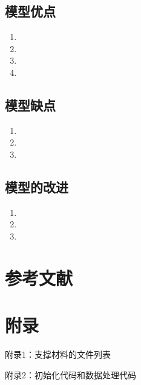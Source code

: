 \documentclass[a4paper]{article}
\begin{document}
	\subsection{模型优点}
	\begin{enumerate}
		\item 
		\item 
		\item 
		\item 
	\end{enumerate}
	
	\subsection{模型缺点}
	\begin{enumerate}
		\item 
		\item 
		\item 
	\end{enumerate}
	
	\subsection{模型的改进}
	\begin{enumerate}
		\item 
		\item 
		\item 
	\end{enumerate}
	
	\section{参考文献}
	\vspace{-2em} %
	\begin{thebibliography}{9}  
	\end{thebibliography}
	
	\newpage
	\section*{附录}
	
	附录1：支撑材料的文件列表
	
	
	
	附录2：初始化代码和数据处理代码
	
\end{document}
